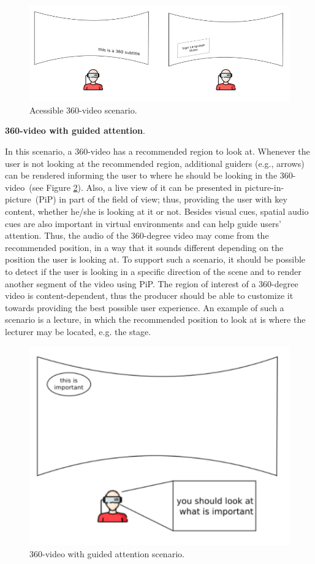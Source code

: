 \begin{figure}[!ht]
    \centering
    \includegraphics[width=0.7\linewidth]{img/video360/accessible.png}
    \caption{Acessible 360-video scenario.}
    \label{fig:cenario_acessivel}
\end{figure}

\textbf{360-video with guided attention}.

In this scenario, a 360-video has a recommended region to look at. Whenever the user is not looking at the recommended region, additional guiders (e.g., arrows) can be rendered informing the user to where he should be looking in the 360-video~(see Figure \ref{fig:cenario_guiado}). Also, a live view of it can be presented in picture-in-picture~(PiP) in part of the field of view; thus, providing the user with key content, whether he/she is looking at it or not. Besides visual cues, spatial audio cues are also important in virtual environments and can help guide users' attention. Thus, the audio of the 360-degree video may come from the recommended position, in a way that it sounds different depending on the position the user is looking at. To support such a scenario, it should be possible to detect if the user is looking in a specific direction of the scene and to render another segment of the video using PiP. The region of interest of a 360-degree video is content-dependent, thus the producer should be able to customize it towards providing the best possible user experience. An example of such a scenario is a lecture, in which the recommended position to look at is where the lecturer may be located, e.g. the stage.

\begin{figure}[!ht]
    \centering
    \includegraphics[width=0.35\linewidth]{img/video360/guided.png}
    \caption{360-video with guided attention scenario.}
    \label{fig:cenario_guiado}
\end{figure}

